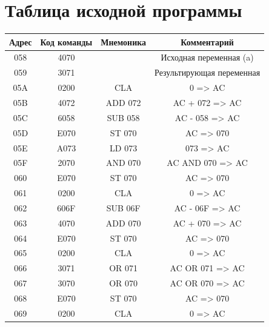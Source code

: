 \documentclass[14pt]{extreport}
\begin{document}
    \chapter{Таблица исходной программы}
        \begin{table}[h]

            \centering
            \begin{tabular}{|c|c|c|c|}
                \hline
                Адрес & Код команды & Мнемоника & Комментарий \\
                \hline
                058    &    4070    &     & Исходная переменная (a)\\ \hline
                059    &    3071    &     & Результирующая переменная \\ \hline
                \hline
                05A    &    0200    &   CLA         & 0 => AC \\ \hline
                05B    &    4072    &   ADD    072  & AC + 072 => AC \\ \hline
                05C    &    6058    &   SUB    058  & AC - 058 => AC \\ \hline
                05D    &    E070    &   ST     070  & AC => 070 \\ \hline
                05E    &    A073    &   LD     073  & 073 => AC \\ \hline
                05F    &    2070    &   AND    070  & AC AND 070 => AC \\ \hline
                060    &    E070    &   ST     070  & AC => 070 \\ \hline
                061    &    0200    &   CLA         & 0 => AC \\ \hline
                062    &    606F    &   SUB    06F  & AC - 06F => AC \\ \hline
                063    &    4070    &   ADD    070  & AC + 070 => AC \\ \hline
                064    &    E070    &   ST     070  & AC => 070 \\ \hline
                065    &    0200    &   CLA         & 0 => AC \\ \hline
                066    &    3071    &   OR     071  & AC OR 071 => AC \\ \hline
                067    &    3070    &   OR     070  & AC OR 070 => AC \\ \hline
                068    &    E070    &   ST     070  & AC => 070 \\ \hline
                069    &    0200    &   CLA         & 0 => AC \\ \hline

\end{tabular}
\end{table}
\end{document}
